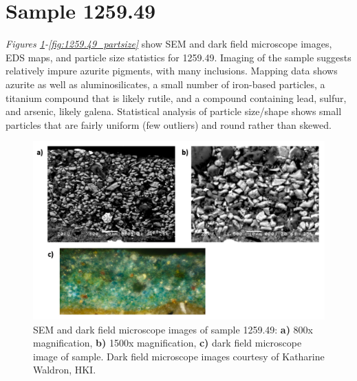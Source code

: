 \section{Sample 1259.49}

\textit{Figures \ref{fig:1259.49_imgs}-\ref{fig:1259.49_partsize}} show SEM and dark field microscope images, EDS maps, and particle size statistics for 1259.49. Imaging of the sample suggests relatively impure azurite pigments, with many inclusions. Mapping data shows azurite as well as aluminosilicates, a small number of iron-based particles, a titanium compound that is likely rutile, and a compound containing lead, sulfur, and arsenic, likely galena. Statistical analysis of particle size/shape shows small particles that are fairly uniform (few outliers) and round rather than skewed.

\begin{figure}[H]
  \centering
  \includegraphics[width=\linewidth]{1259-49_imgs}
\caption[SEM and dark field microscope images of sample 1259.49.]{SEM and dark field microscope images of sample 1259.49: \textbf{a)} 800x magnification, \textbf{b)} 1500x magnification, \textbf{c)} dark field microscope image of sample. Dark field microscope images courtesy of Katharine Waldron, HKI.}
\label{fig:1259.49_imgs}
\end{figure}

